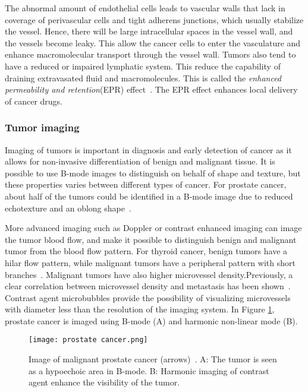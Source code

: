 The abnormal amount of endothelial cells leads to vascular walls that lack in coverage of perivascular cells and tight adherens junctions, which usually stabilize the vessel. Hence, there will be large intracellular spaces in the vessel wall, and the vessels become leaky. This allow the cancer cells to enter the vasculature and enhance macromolecular transport through the vessel wall. Tumors also tend to have a reduced or impaired lymphatic system. This reduce the capability of draining extravasated fluid and macromolecules. This is called the \textit{enhanced permeability and retention}(EPR) effect~\cite{Matsumura1986}. The EPR effect enhances local delivery of cancer drugs.



\subsubsection{Tumor imaging}
Imaging of tumors is important in diagnosis and early detection of cancer as it allows for non-invasive differentiation of benign and malignant tissue. It is possible to use B-mode images to distinguish on behalf of shape and texture, but these properties varies between different types of cancer. For prostate cancer, about half of the tumors could be identified in a B-mode image due to reduced echotexture and an oblong shape~\cite{Halpern2006}. 

More advanced imaging such as Doppler or contrast enhanced imaging can image the tumor blood flow, and make it possible to distinguish benign and malignant tumor from the blood flow pattern. For thyroid cancer, benign tumors have a hilar flow pattern, while malignant tumors have a peripheral pattern with short branches~\cite{Go2003}. Malignant tumors have also higher microvessel density.Previously, a clear correlation between microvessel density and metastasis has been shown~\cite{Rifkin1990}. Contrast agent microbubbles provide the possibility of visualizing microvessels with diameter less than the resolution of the imaging system. In Figure \ref{Fig:prostate cancer}, prostate cancer is imaged using B-mode (A) and harmonic non-linear mode (B).

\begin{figure}[h]
  \centering
  \texttt{[image: prostate cancer.png]}
  \caption{Image of malignant prostate cancer (arrows)~\cite{Halpern2006}. A: The tumor is seen as a hypoechoic area in B-mode. B: Harmonic imaging of contrast agent enhance the visibility of the tumor.}
  \label{Fig:prostate cancer}
\end{figure}

